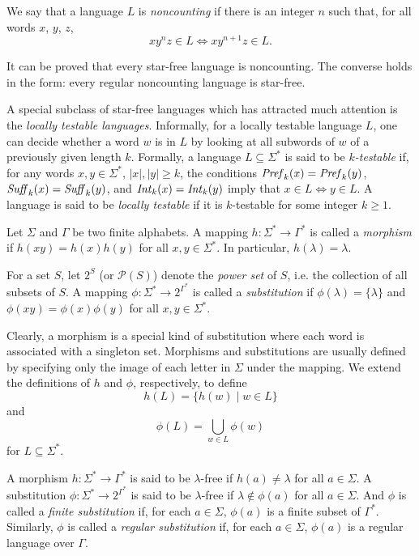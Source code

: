 We say that a language $L$ is \emph{noncounting} if there is an integer $n$ such that, for all words $x$, $y$, $z$, $$x y^n z \in L \Leftrightarrow x y^{n+1} z \in L.$$

It can be proved that every star-free language is noncounting. The converse holds in the form: every regular noncounting language is star-free.

A special subclass of star-free languages which has attracted much attention is the \emph{locally testable languages}. Informally, for a locally testable language $L$, one can decide whether a word $w$ is in $L$ by looking at all subwords of $w$ of a previously given length $k$. Formally, a language $L \subseteq \Sigma^*$ is said to be \emph{$k$-testable} if, for any words $x, y \in \Sigma^*$, $|x|, |y| \ge k$, the conditions $\mbox{\it Pref\/}_k(x) = \mbox{\it Pref\/}_k(y)$, $\mbox{\it Suff\/}_k(x) = \mbox{\it Suff\/}_k(y)$, and $\mbox{\it Int\/}_k(x) = \mbox{\it Int\/}_k(y)$ imply that $x \in L \Leftrightarrow y \in L$. A language is said to be \emph{locally testable} if it is $k$-testable for some integer $k \ge 1$.

Let $\Sigma$ and $\Gamma$ be two finite alphabets. A mapping $h: \Sigma^* \to \Gamma^*$ is called a \emph{morphism} if $h(xy) = h(x) h(y)$ for all $x, y \in \Sigma^*$. In particular, $h(\lambda) = \lambda$.

For a set $S$, let $2^S$ (or $\mathcal{P}(S)$) denote the \emph{power set} of $S$, i.e. the collection of all subsets of $S$. A mapping $\phi: \Sigma^* \to 2^{\Gamma^*}$ is  called a \emph{substitution} if $\phi(\lambda) = \{\lambda\}$ and $\phi(xy) = \phi(x) \phi(y)$ for all $x, y \in \Sigma^*$.

Clearly, a morphism is a special kind of substitution where each word is associated with a singleton set. Morphisms and substitutions are usually defined by specifying only the image of each letter in $\Sigma$ under the mapping. We extend the definitions of $h$ and $\phi$, respectively, to define $$h(L) = \{h(w) \mid w \in L\}$$ and $$\phi(L) = \bigcup_{w \in L}\phi(w)$$ for $L \subseteq \Sigma^*$.

A morphism $h: \Sigma^* \to \Gamma^*$ is said to be $\lambda$-free if $h(a) \neq \lambda$ for all $a \in \Sigma$. A substitution $\phi: \Sigma^* \to 2^{\Gamma^*}$ is said to be $\lambda$-free if $\lambda \notin \phi(a)$ for all $a \in \Sigma$. And $\phi$ is called a  \emph{finite substitution} if, for each $a \in \Sigma$, $\phi(a)$ is a finite subset of $\Gamma^*$. Similarly, $\phi$ is called a  \emph{regular substitution} if, for each $a \in \Sigma$, $\phi(a)$ is a regular language over $\Gamma$.

